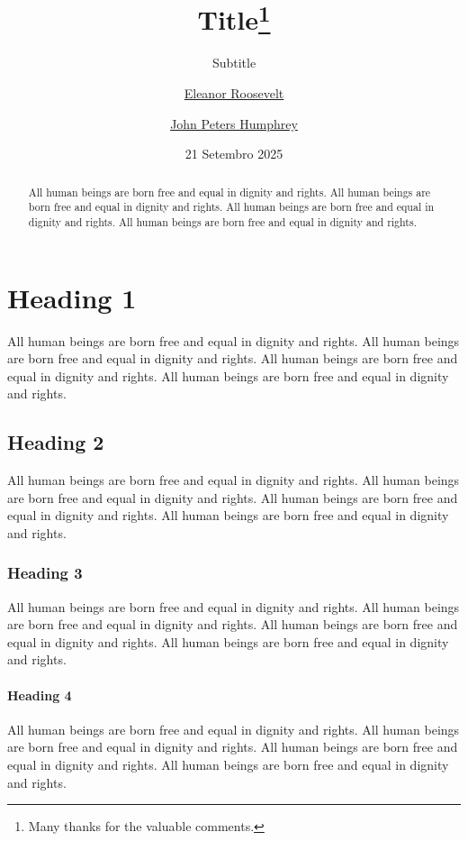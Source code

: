\documentclass[
  ngerman,
  american,
  ]{scrartcl}
\title{Title\thanks{Many thanks for the valuable comments.}}
\subtitle{Subtitle}
\author{\href{eleanor.eoosevelt@domain.com}{Eleanor
Roosevelt} \and \href{jph@domain.com}{John Peters Humphrey}}
\date{21 Setembro 2025}
\begin{document}
\maketitle
\begin{abstract}
All human beings are born free and equal in dignity and rights. All
human beings are born free and equal in dignity and rights. All human
beings are born free and equal in dignity and rights. All human beings
are born free and equal in dignity and rights.
\end{abstract}



\renewcommand*\contentsname{Contents}
{
\setcounter{tocdepth}{2}
\tableofcontents
}
\listoffigures
\listoftables
\section{Heading 1}\label{heading-1}

All human beings are born free and equal in dignity and rights. All
human beings are born free and equal in dignity and rights. All human
beings are born free and equal in dignity and rights. All human beings
are born free and equal in dignity and rights.

\subsection{Heading 2}\label{heading-2}

All human beings are born free and equal in dignity and rights. All
human beings are born free and equal in dignity and rights. All human
beings are born free and equal in dignity and rights. All human beings
are born free and equal in dignity and rights.

\subsubsection{Heading 3}\label{heading-3}

All human beings are born free and equal in dignity and rights. All
human beings are born free and equal in dignity and rights. All human
beings are born free and equal in dignity and rights. All human beings
are born free and equal in dignity and rights.

\paragraph{Heading 4}\label{heading-4}

All human beings are born free and equal in dignity and rights. All
human beings are born free and equal in dignity and rights. All human
beings are born free and equal in dignity and rights. All human beings
are born free and equal in dignity and rights.
\end{document}
